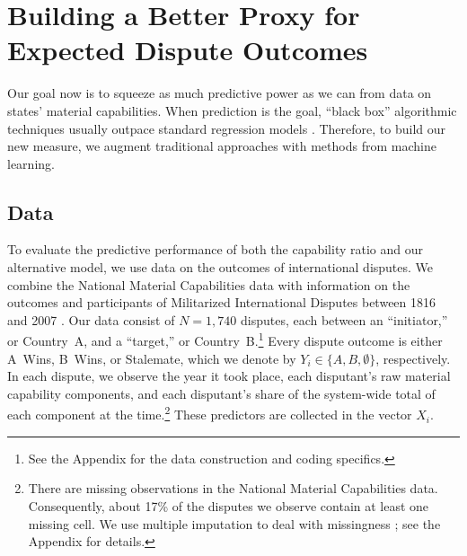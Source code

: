 \section{Building a Better Proxy for Expected Dispute Outcomes}
\label{sec:methods}

Our goal now is to squeeze as much predictive power as we can from data on states' material capabilities.
When prediction is the goal, ``black box'' algorithmic techniques usually outpace standard regression models \citep{Breiman:2001fd}.
Therefore, to build our new measure, we augment traditional approaches with methods from machine learning.

\subsection{Data}

To evaluate the predictive performance of both the capability ratio and our alternative model, we use data on the outcomes of international disputes.
We combine the National Material Capabilities data \citep{singer1972} with information on the outcomes and participants of Militarized International Disputes between 1816 and 2007 \citep{Palmer:2015hp}.
Our data consist of $N = 1{,}740$ disputes, each between an ``initiator,'' or Country~A, and a ``target,'' or Country~B.\footnote{
  See the Appendix for the data construction and coding specifics.
}
Every dispute outcome is either A~Wins, B~Wins, or Stalemate, which we denote by $Y_i \in \{A, B, \emptyset\}$, respectively.
In each dispute, we observe the year it took place, each disputant's raw material capability components, and each disputant's share of the system-wide total of each component at the time.\footnote{
  There are missing observations in the National Material Capabilities data.
  Consequently, about 17\% of the disputes we observe contain at least one missing cell.
  We use multiple imputation to deal with missingness \citep{honaker_what_2010}; see the Appendix for details.
}
These predictors are collected in the vector $X_i$.

